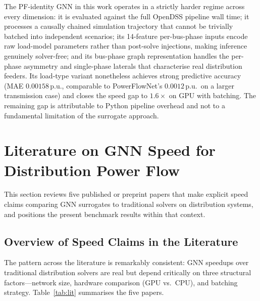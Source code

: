 \documentclass[11pt]{article}
\begin{document}
The PF-identity GNN in this work operates in a strictly harder regime across
every dimension: it is evaluated against the full OpenDSS pipeline wall time;
it processes a causally chained simulation trajectory that cannot be trivially
batched into independent scenarios; its 14-feature per-bus-phase inputs encode
raw load-model parameters rather than post-solve injections, making inference
genuinely solver-free; and its bus-phase graph representation handles the
per-phase asymmetry and single-phase laterals that characterise real
distribution feeders.  Its load-type variant nonetheless achieves strong
predictive accuracy (MAE $0.00158$\,p.u., comparable to PowerFlowNet's
$0.0012$\,p.u.\ on a larger transmission case) and closes the speed gap
to $1.6\times$ on GPU with batching.  The remaining gap is attributable
to Python pipeline overhead and not to a fundamental limitation of the
surrogate approach.

\section{Literature on GNN Speed for Distribution Power Flow}
\label{sec:lit}

This section reviews five published or preprint papers that make explicit
speed claims comparing GNN surrogates to traditional solvers on distribution
systems, and positions the present benchmark results within that context.

\subsection{Overview of Speed Claims in the Literature}

The pattern across the literature is remarkably consistent: GNN speedups over
traditional distribution solvers are real but depend critically on three
structural factors---network size, hardware comparison (GPU vs.\ CPU),
and batching strategy.  Table~\ref{tab:lit} summarises the five papers.
\end{document}
